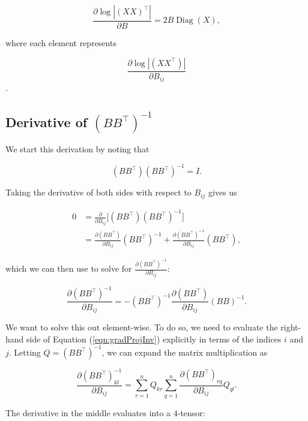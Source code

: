 \documentclass[12pt]{article}
\theoremstyle{definition}
\DeclareMathOperator{\Diag}{Diag}
\begin{document}
\begin{equation}
    \label{eqn:gradLogDetMatrix}
    \frac{\partial \log |(XX)^\top|}{\partial B} = 2B \Diag(X),
\end{equation}

where each element represents 

\[\frac{\partial \log |(XX^\top)|}{\partial B_{ij}}\].

\subsection{Derivative of $(BB^\top)^{-1}$}
\label{subsec:gradProjInvDerivation}

We start this derivation by noting that

\[
(BB^\top)(BB^\top)^{-1} = I.
\]

Taking the derivative of both sides with respect to $B_{ij}$ gives us

\[
\begin{split}
    0 & = \frac{\partial}{\partial B_{ij}} \big[(BB^\top)(BB^\top)^{-1} \big] \\ 
    & = \frac{\partial (BB^\top)}{\partial B_{ij}} (BB^\top)^{-1} + \frac{\partial (BB^\top)^{-1}}{\partial B_{ij}} (BB^\top),
\end{split}
\]

which we can then use to solve for $\frac{\partial (BB^\top)^{-1}}{\partial B_{ij}}$:

\begin{equation}
    \label{eqn:gradProjInv}
    \frac{\partial (BB^\top)^{-1}}{\partial B_{ij}} = -(BB^\top)^{-1} \frac{\partial (BB^\top)}{\partial B_{ij}} (BB)^{-1}.
\end{equation}

We want to solve this out element-wise. To do so, we need to evaluate the right-hand side of Equation (\ref{eqn:gradProjInv}) explicitly in terms of the indices $i$ and $j$. Letting $Q = (BB^\top)^{-1}$, we can expand the matrix multiplication as

\begin{equation}
    \label{eqn:gradProjInvHighLevel}
    \frac{\partial (BB^\top)^{-1}_{kl}}{\partial B_{ij}} = \sum_{r=1}^{n} Q_{kr} \sum_{q=1}^{n} \frac{\partial (BB^\top)_{rq}}{\partial B_{ij}} Q_{ql}.
\end{equation}

The derivative in the middle evaluates into a $4$-tensor:
\end{document}
